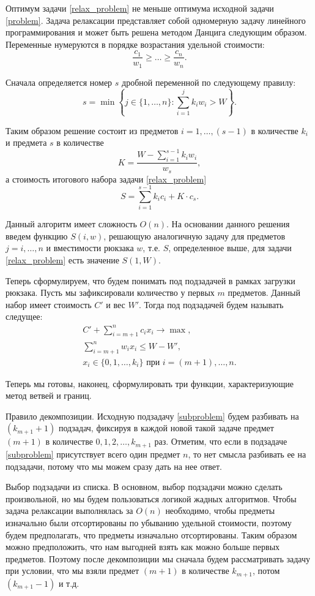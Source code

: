 \documentclass[12pt, a4paper]{article}
\begin{document}
	Оптимум задачи \eqref{relax_problem} не меньше оптимума исходной задачи \eqref{problem}. Задача релаксации представляет собой одномерную задачу линейного программирования и может быть решена методом Данцига следующим образом. Переменные нумеруются в порядке возрастания удельной стоимости:
	\[
	\frac{c_1}{w_1} \ge \dots \ge \frac{c_n}{w_n}.
	\]
	
	Сначала определяется номер $s$ дробной переменной по следующему правилу:
	\[
	s = \min \left\{j \in \{1,\dots, n\} : \sum_{i=1}^j k_i w_i > W \right\}.
	\]
	
	Таким образом решение состоит из предметов $i = 1, \dots, (s-1)$ в количестве $k_i$ и предмета $s$ в количестве
	\[
	K = \frac{W - \sum\limits_{i=1}^{s-1} k_i w_i}{w_s},
	\]
	а стоимость итогового набора задачи \eqref{relax_problem}
	\[
	S = \sum_{i=1}^{s-1} k_i c_i + K\cdot c_s.
	\]
	
	Данный алгоритм имеет сложность $O(n)$. На основании данного решения введем функцию $S(i, w)$, решающую аналогичную задачу для предметов $j = i,\dots, n$ и вместимости рюкзака $w$, т.е. $S$, определенное выше, для задачи \eqref{relax_problem} есть значение $S(1, W)$.
	
	Теперь сформулируем, что будем понимать под подзадачей в рамках загрузки рюкзака. Пусть мы зафиксировали количество у первых $m$ предметов. Данный набор имеет стоимость $C'$ и вес $W'$. Тогда под подзадачей будем называть следущее:
	\begin{equation}
		\label{subproblem}
		\begin{gathered}
			C' + \sum_{i=m+1}^{n} c_i x_i \rightarrow \max, \\
			\sum_{i=m+1}^{n} w_i x_i \le W - W', \\
			x_i \in \{0,1,\dots,k_i\} \textrm{ при } i=(m+1),\dots, n.
		\end{gathered}
	\end{equation}
	
	Теперь мы готовы, наконец, сформулировать три функции, характеризующие метод ветвей и границ.
	
	Правило декомпозиции. Исходную подзадачу \eqref{subproblem} будем разбивать на $(k_{m+1}+1)$ подзадач, фиксируя в каждой новой такой задаче предмет $(m + 1)$ в количестве $0, 1, 2, \dots, k_{m+1}$ раз. Отметим, что если в подзадаче \eqref{subproblem} присутствует всего один предмет $n$, то нет смысла разбивать ее на подзадачи, потому что мы можем сразу дать на нее ответ.
	
	Выбор подзадачи из списка. В основном, выбор подзадачи можно сделать произвольной, но мы будем пользоваться логикой жадных алгоритмов. Чтобы задача релаксации выполнялась за $O(n)$ необходимо, чтобы предметы изначально были отсортированы по убыванию удельной стоимости, поэтому будем предполагать, что предметы изначально отсортированы. Таким образом можно предположить, что нам выгодней взять как можно больше первых предметов. Поэтому после декомпозиции мы сначала будем рассматривать задачу при условии, что мы взяли предмет $(m+1)$ в количестве $k_{m+1}$, потом $(k_{m+1} - 1)$ и т.д.
	
\end{document}
